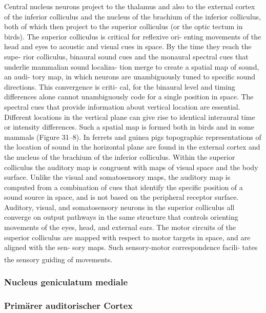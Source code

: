 \documentclass[12pt,a4paper,pdftex]{article}
\begin{document}
Central nucleus neurons project to the thalamus and
also to the external cortex of the inferior colliculus and
the nucleus of the brachium of the inferior colliculus,
both of which then project to the superior colliculus (or
the optic tectum in birds).
The superior colliculus is critical for reflexive ori-
enting movements of the head and eyes to acoustic and
visual cues in space. By the time they reach the supe-
rior colliculus, binaural sound cues and the monaural
spectral cues that underlie mammalian sound localiza-
tion merge to create a spatial map of sound, an audi-
tory map, in which neurons are unambiguously tuned
to specific sound directions. This convergence is criti-
cal, for the binaural level and timing differences alone
cannot unambiguously code for a single position in
space. The spectral cues that provide information about
vertical location are essential. Different locations in the
vertical plane can give rise to identical interaural time
or intensity differences. Such a spatial map is formed
both in birds and in some mammals (Figure 31–8). In
ferrets and guinea pigs topographic representations of
the location of sound in the horizontal plane are found
in the external cortex and the nucleus of the brachium
of the inferior colliculus.
Within the superior colliculus the auditory map
is congruent with maps of visual space and the body
surface. Unlike the visual and somatosensory maps,
the auditory map is computed from a combination
of cues that identify the specific position of a sound
source in space, and is not based on the peripheral
receptor surface.
Auditory, visual, and somatosensory neurons in the
superior colliculus all converge on output pathways in
the same structure that controls orienting movements
of the eyes, head, and external ears. The motor circuits
of the superior colliculus are mapped with respect to
motor targets in space, and are aligned with the sen-
sory maps. Such sensory-motor correspondence facili-
tates the sensory guiding of movements. \textsuperscript{\cite[31]{kandel2013principles}}

\subsubsection*{Nucleus geniculatum mediale}



\subsubsection*{Primärer auditorischer Cortex}
\end{document}
